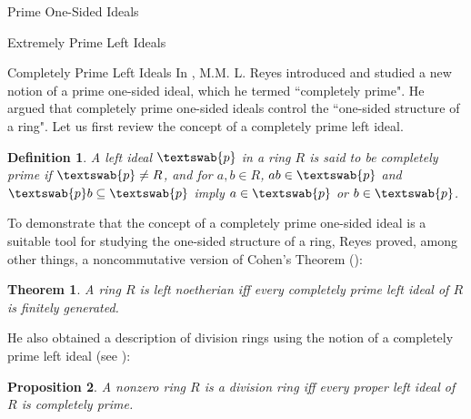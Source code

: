 \documentclass[11pt,a4paper]{article}
\theoremstyle{theorem}
\newtheorem{theorem}{Theorem}[section]
\newtheorem{proposition}[theorem]{Proposition}
\newtheorem{definition}{Definition}[section]
\numberwithin{equation}{section}
\begin{document}
\begin{section}{Prime One-Sided Ideals}
\begin{subsection}{Extremely Prime Left Ideals}
 \end{subsection}
\begin{subsection}{Completely Prime Left Ideals}
	In \cite{reyes2010one}, M.M. L.  Reyes introduced and studied a new notion of a prime one-sided ideal, which he termed ``completely prime".  He argued that completely prime one-sided ideals  control the ``one-sided structure of a ring". Let us first review the concept of a completely prime left ideal.  
	 \begin{definition}\label{def: completely prime left ideal}
		A left ideal  \( \textswab{p} \) in a  ring \( R \) is said to be \emph{completely prime} if \( \textswab{p} \neq R \), and   for \( a,b\in R\), \( ab\in \textswab{p}\) and \( \textswab{p}b\subseteq\textswab{p}\) imply \( a\in \textswab{p}\) or \( b\in \textswab{p}\). 
	\end{definition}	
	To demonstrate that the concept of a completely prime one-sided ideal is a suitable tool for studying the one-sided structure of a ring,  Reyes proved, among other things, a noncommutative version of Cohen's Theorem  (\cite[Theorem 3.8]{reyes2010one}):
	\begin{theorem}\label{thm: Noncommutative Cohen using completely prime left ideals}
		A ring \( R \) is left noetherian iff every completely prime left ideal of \( R \) is finitely generated. 
	\end{theorem}
	He also obtained a description of division rings using the notion of a completely prime left ideal (see \cite[Proposition 2.11]{reyes2010one}):
	\begin{proposition}\label{prop: division rings using completely prime left ideals}
		A nonzero ring \( R \) is a division ring iff every  proper left ideal of \( R \) is completely prime. 
	\end{proposition}
	

\end{subsection}
\end{section}
\end{document}
